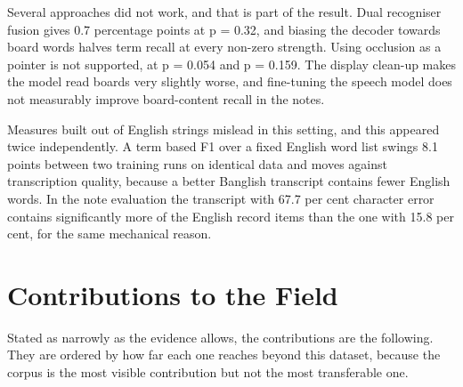Several approaches did not work, and that is part of the result. Dual recogniser fusion
gives 0.7 percentage points at p = 0.32, and biasing the decoder towards board words halves
term recall at every non-zero strength. Using occlusion as a pointer is not supported, at
p = 0.054 and p = 0.159. The display clean-up makes the model read boards very slightly
worse, and fine-tuning the speech model does not measurably improve board-content recall
in the notes.

Measures built out of English strings mislead in this setting, and this appeared twice
independently. A term based F1 over a fixed English word list swings 8.1 points between
two training runs on identical data and moves against transcription quality, because a
better Banglish transcript contains fewer English words. In the note evaluation the
transcript with 67.7 per cent character error contains significantly more of the English
record items than the one with 15.8 per cent, for the same mechanical reason.

\section{Contributions to the Field}

Stated as narrowly as the evidence allows, the contributions are the following. They are
ordered by how far each one reaches beyond this dataset, because the corpus is the most
visible contribution but not the most transferable one.

